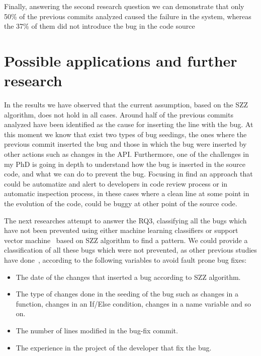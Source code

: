 \documentclass[ifip]{svmult}
\begin{document}
Finally, answering the second research question we can demonstrate that only 50\% of the previous commits analyzed caused the failure in the system, whereas the 37\% of them did not introduce the bug in the code source 

\section{Possible applications and further research}
\label{sec:discussion}

In the results we have observed that the current assumption, based on the SZZ algorithm, does not hold in all cases. Around half of the previous commits analyzed have been identified as the cause for inserting the line with the bug. At this moment we know that exist two types of bug seedings, the ones where the previous commit inserted the bug and those in which the bug were inserted by other actions such as changes in the API. Furthermore, one of the challenges in my PhD is going in depth to understand how the bug is inserted in the source code, and what we can do to prevent the bug. Focusing in find an approach that could be automatize and alert to developers in code review process or in automatic inspection process, in these cases where a clean line at some point in the evolution of the code, could be buggy at other point of the source code.

The next researches attempt to answer the RQ3, classifying all the bugs which have not been prevented using either machine learning classifiers or support vector machine~\cite{shivaji2009reducing,shivaji2013reducing} based on SZZ algorithm to find a pattern. We could provide a classification of all these bugs which were not prevented, as other previous studies have done~\cite{kim2008classifying,kamei2010revisiting,matsumoto2010analysis,hata2012bug,fujiwara2013assessing}, according to the following variables to avoid fault prone bug fixes:

\begin{itemize}
  \item The date of the changes that inserted a bug according to SZZ algorithm.
  \item The type of changes done in the seeding of the bug such as changes in a function, changes in an If/Else condition, changes in a name variable and so on.
  \item The number of lines modified in the bug-fix commit.
  \item The experience in the project of the developer that fix the bug.
\end{itemize} 
\end{document}

